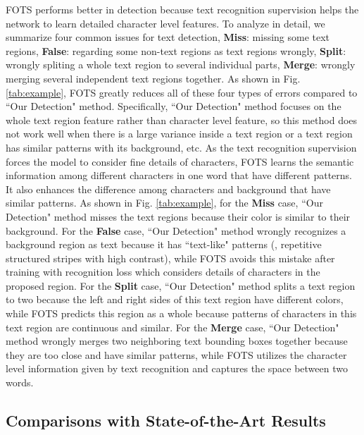 \documentclass[10pt,twocolumn,letterpaper]{article}
\begin{document}
FOTS performs better in detection because text recognition supervision helps the network to learn detailed character level features. To analyze in detail, we summarize four common issues for text detection, \textbf{Miss}: missing some text regions, \textbf{False}:  regarding some non-text regions as text regions wrongly, \textbf{Split}: wrongly spliting a whole text region to several individual parts, \textbf{Merge}: wrongly merging several independent text regions together. As shown in Fig. \ref{tab:example}, FOTS greatly reduces all of these four types of errors compared to ``Our Detection" method. Specifically, ``Our Detection" method focuses on the whole text region feature rather than character level feature, so this method does not work well when there is a large variance inside a text region or a text region has similar patterns with its background, etc. As the text recognition supervision forces the model to consider fine details of characters, FOTS learns the semantic information among different characters in one word that have different patterns. It also enhances the difference among characters and background that have similar patterns. As shown in Fig. \ref{tab:example}, for the \textbf{Miss} case, ``Our Detection" method misses the text regions because their color is similar to their background. For the \textbf{False} case, ``Our Detection" method wrongly recognizes a background region as text because it has ``text-like" patterns (\eg, repetitive structured stripes with high contrast), while FOTS avoids this mistake after training with recognition loss which considers details of characters in the proposed region. For the \textbf{Split} case, ``Our Detection" method splits a text region to two because the left and right sides of this text region have different colors, while FOTS predicts this region as a whole because patterns of characters in this text region are continuous and similar. For the \textbf{Merge} case, ``Our Detection" method wrongly merges two neighboring text bounding boxes together because they are too close and have similar patterns, while FOTS utilizes the character level information given by text recognition and captures the space between two words.


\subsection{Comparisons with State-of-the-Art Results}
\end{document}
